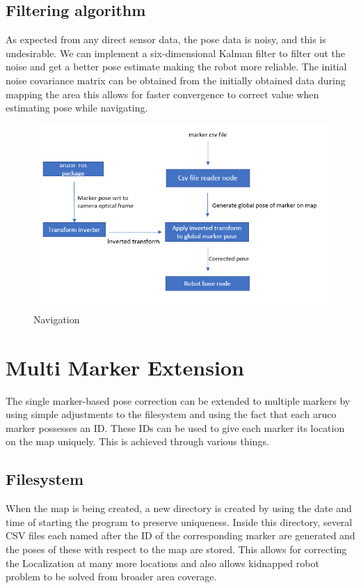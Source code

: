 \documentclass[12pt]{article}
\begin{document}
\subsection{Filtering algorithm}
\par As expected from any direct sensor data, the pose data is noisy, and this is undesirable. We can implement a six-dimensional Kalman filter to filter out the noise and get a better pose estimate making the robot more reliable. The initial noise covariance matrix can be obtained from the initially obtained data during mapping the area this allows for faster convergence to correct value when estimating pose while navigating.

\begin{figure}[H]
\centering
\includegraphics[scale=0.8]{1markernavig.PNG}
\caption{Navigation}
\end{figure}

\section{Multi Marker Extension}
\par The single marker-based pose correction can be extended to multiple markers by using simple adjustments to the filesystem and using the fact that each aruco marker possesses an ID. These IDs can be used to give each marker its location on the map uniquely. This is achieved through various things.

\subsection{Filesystem}
\par When the map is being created, a new directory is created by using the date and time of starting the program to preserve uniqueness. Inside this directory, several CSV files each named after the ID of the corresponding marker are generated and the poses of these with respect to the map are stored. This allows for correcting the Localization at many more locations and also allows kidnapped robot problem to be solved from broader area coverage.
\end{document}
